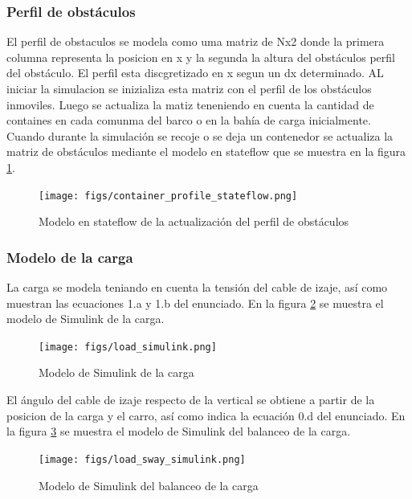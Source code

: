 \documentclass{article}
\begin{document}
        \subsubsection{Perfil de obstáculos}
        El perfil de obstaculos se modela como uma matriz de Nx2 donde la primera columna representa la posicion en x y la segunda la altura del obstáculos perfil del obstáculo. El perfil esta discgretizado en x segun un dx determinado. 
        AL iniciar la simulacion se inizializa esta matriz con el perfil de los obstáculos inmoviles. Luego se actualiza la matiz teneniendo en cuenta la cantidad de containes en cada comunma del barco o en la bahía de carga inicialmente.
        Cuando durante la simulación se recoje o se deja un contenedor se actualiza la matriz de obstáculos mediante el modelo en stateflow que se muestra en la figura \ref{fig:container_profile_stateflow}.
        \begin{figure} [H]
            \centering
            \texttt{[image: figs/container\_profile\_stateflow.png]}
            \caption{Modelo en stateflow de la actualización del perfil de obstáculos}
            \label{fig:container_profile_stateflow}
        \end{figure}



        \subsubsection{Modelo de la carga}
            
            La carga se modela teniando en cuenta la tensión del cable de izaje, así como muestran las ecuaciones 1.a y 1.b del enunciado. En la figura \ref{fig:load_simulink} se muestra el modelo de Simulink de la carga.

            \begin{figure} [H]
                \centering
                \texttt{[image: figs/load\_simulink.png]}
                \caption{Modelo de Simulink de la carga}
                \label{fig:load_simulink}
            \end{figure}

            El ángulo del cable de izaje respecto de la vertical se obtiene a partir de la posicion de la carga y el carro, así como indica la ecuación 0.d del enunciado. En la figura \ref{fig:load_sway_simulink} se muestra el modelo de Simulink del balanceo de la carga.

            \begin{figure} [H]
                \centering
                \texttt{[image: figs/load\_sway\_simulink.png]}
                \caption{Modelo de Simulink del balanceo de la carga}
                \label{fig:load_sway_simulink}
            \end{figure}
\end{document}
